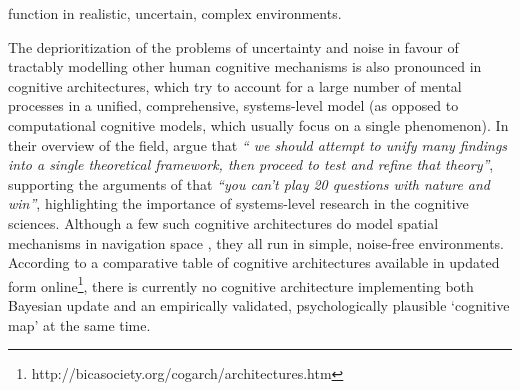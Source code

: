 \clearpage

\noindent function in realistic, uncertain, complex environments.

The deprioritization of the problems of uncertainty and noise in favour of tractably modelling other human cognitive mechanisms is also pronounced in cognitive architectures, which try to account for a large number of mental processes in a unified, comprehensive, systems-level model (as opposed to computational cognitive models, which usually focus on a single phenomenon). In their overview of the field, \cite{langley2009cognitive} argue that \textit{`` we should attempt to unify many findings into a single theoretical framework, then proceed to test and refine that theory''}, supporting the arguments of \cite{newell1973you} that \textit{``you can't play 20 questions with nature and win''}, highlighting the importance of systems-level research in the cognitive sciences. Although a few such cognitive architectures do model spatial mechanisms in navigation space \citep{harrison2003act,schultheis2011casimir,sun2004top}, they all run in simple, noise-free environments. According to a comparative table of cognitive architectures \citep{samsonovich2011comparative} available in updated form online\footnote{http://bicasociety.org/cogarch/architectures.htm}, there is currently no cognitive architecture implementing both Bayesian update and an empirically validated, psychologically plausible `cognitive map' at the same time.

